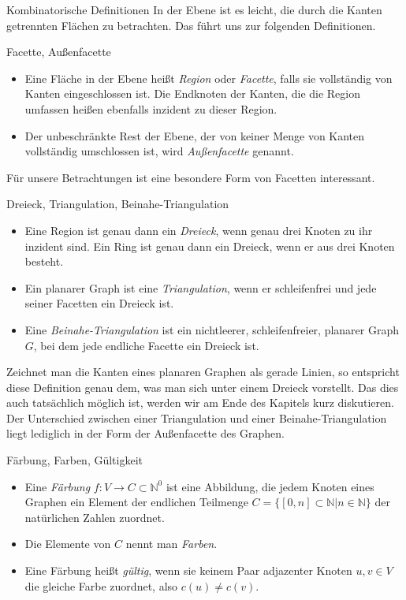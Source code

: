 \begin{section}{Kombinatorische Definitionen}
  In der Ebene ist es leicht, die durch die Kanten getrennten Flächen zu betrachten. Das führt uns zur folgenden Definitionen.
  
  \begin{definition}{Facette, Außenfacette}
   \-\ 
   \begin{itemize}
   \item Eine Fläche in der Ebene heißt \textit{Region} oder \textit{Facette}, falls sie vollständig von Kanten eingeschlossen ist. Die Endknoten der Kanten, die die Region umfassen heißen ebenfalls inzident zu dieser Region. 
   \item Der unbeschränkte Rest der Ebene, der von keiner Menge von Kanten vollständig umschlossen ist, wird \textit{Außenfacette} genannt.
   \end{itemize}
  \end{definition}
  
  Für unsere Betrachtungen ist eine besondere Form von Facetten interessant. 
  
  \begin{definition}{Dreieck, Triangulation, Beinahe-Triangulation}
   \-\ 
   \begin{itemize}
   \item Eine Region ist genau dann ein \textit{Dreieck}, wenn genau drei Knoten zu ihr inzident sind. Ein Ring ist genau dann ein Dreieck, wenn er aus drei Knoten besteht.
   \item Ein planarer Graph ist eine \textit{Triangulation}, wenn er schleifenfrei und jede seiner Facetten ein Dreieck ist. 
   \item Eine \textit{Beinahe-Triangulation} ist ein nichtleerer, schleifenfreier, planarer Graph $G$, bei dem jede endliche Facette ein Dreieck ist. 
   \end{itemize}
  \end{definition}
  
  Zeichnet man die Kanten eines planaren Graphen als gerade Linien, so entspricht diese Definition genau dem, was man sich unter einem Dreieck vorstellt. Das dies auch tatsächlich möglich ist, werden wir am Ende des Kapitels kurz diskutieren. Der Unterschied zwischen einer Triangulation und einer Beinahe-Triangulation liegt lediglich in der Form der Außenfacette des Graphen. 
 
  \begin{definition}{Färbung, Farben, Gültigkeit}
   \-\ 
   \begin{itemize}
   \item Eine \textit{Färbung} $f: V \rightarrow C \subset \mathbb{N}^0$ ist eine Abbildung, die jedem Knoten eines Graphen ein Element der endlichen Teilmenge $C = \{[0,n] \subset \mathbb{N}| n \in \mathbb{N}\}$ der natürlichen Zahlen zuordnet. 
   \item Die Elemente von $C$ nennt man \textit{Farben}. 
   \item Eine Färbung heißt \textit{gültig}, wenn sie keinem Paar adjazenter Knoten $u,v \in V$ die gleiche Farbe zuordnet, also $c(u) \neq c(v)$. 
   \end{itemize}
  \end{definition}
  

\end{section}
